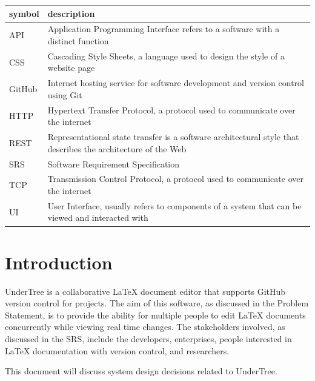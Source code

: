 \documentclass[12pt, titlepage]{article}
\begin{document}
	\renewcommand{\arraystretch}{1.2}
	\begin{table}[H]
		\small
		\centering
		\begin{tabular}{l p{15cm}} 
			\toprule		
			\textbf{symbol} & \textbf{description}\\
			\midrule
			API & Application Programming Interface refers to a software with a distinct function\\
			CSS & Cascading Style Sheets, a language used to design the style of a website page\\
			GitHub & Internet hosting service for software development and version control using Git\\
			HTTP & Hypertext Transfer Protocol, a protocol used to communicate over the internet\\
			REST & Representational state transfer is a software architectural style that describes the architecture of the Web\\
			SRS & Software Requirement Specification\\
			TCP & Transmission Control Protocol, a protocol used to communicate over the internet\\
			UI & User Interface, usually refers to components of a system that can be viewed and interacted with\\
			\bottomrule
		\end{tabular}
	\end{table}
	
	\newpage
	
	\tableofcontents
	
	\newpage
	
	\listoftables
	
	\listoffigures
	
	\newpage
	
	
	\section{Introduction}
	UnderTree is a collaborative LaTeX document editor that supports GitHub version control for projects. The aim of this software, as discussed in the Problem Statement, is to provide the ability for multiple people to edit LaTeX documents concurrently while viewing real time changes. The stakeholders involved, as discussed in the SRS, include the developers, enterprises, people interested in LaTeX documentation with version control, and researchers.
	
	This document will discuss system design decisions related to UnderTree.
	
\end{document}
